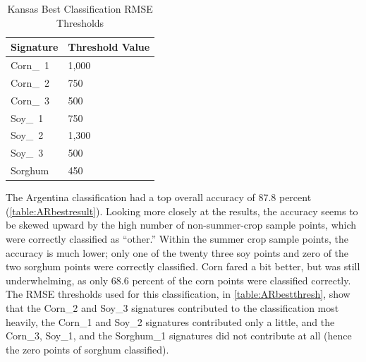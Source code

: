 \begin{table}[b]
  \begin{Spacing}{1.0}
  \centering
  \caption{Kansas Best Classification RMSE Thresholds}
  \label{table:ksbestthresh}
  \begin{tabu} to 4in {ZZ}
    \toprule
    \textbf{Signature} & \textbf{Threshold Value} \\
    \midrule
    Corn\_~1 & 1,000 \\
    Corn\_~2 & 750 \\
    Corn\_~3 & 500 \\
    Soy\_~1 & 750 \\
    Soy\_~2 & 1,300 \\
    Soy\_~3 & 500 \\
    Sorghum & 450 \\
    \bottomrule
  \end{tabu}
  \end{Spacing}
\end{table}

The Argentina classification had a top overall accuracy of 87.8 percent (\autoref{table:ARbestresult}). Looking more closely at the results, the accuracy seems to be skewed upward by the high number of non-summer-crop sample points, which were correctly classified as ``other.'' Within the summer crop sample points, the accuracy is much lower; only one of the twenty three soy points and zero of the two sorghum points were correctly classified. Corn fared a bit better, but was still underwhelming, as only 68.6 percent of the corn points were classified correctly. The RMSE thresholds used for this classification, in \autoref{table:ARbestthresh}, show that the Corn\_2 and Soy\_3 signatures contributed to the classification most heavily, the Corn\_1 and Soy\_2 signatures contributed only a little, and the Corn\_3, Soy\_1, and the Sorghum\_1 signatures did not contribute at all (hence the zero points of sorghum classified).

